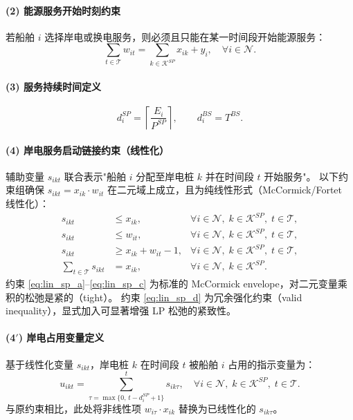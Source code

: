 \documentclass[UTF8, a4paper, 12pt]{ctexart}
\begin{document}
\paragraph{(2) 能源服务开始时刻约束}
若船舶 $i$ 选择岸电或换电服务，则必须且只能在某一时间段开始能源服务：
\begin{equation}
\sum_{t \in \mathcal{T}} w_{it}
=
\sum_{k \in \mathcal{K}^{SP}} x_{ik} + y_i,
\quad \forall i \in \mathcal{N}.
\label{eq:w_unique_24}
\end{equation}

\paragraph{(3) 服务持续时间定义}
\begin{equation}
d_i^{SP} = \left\lceil \frac{E_i}{P^{SP}} \right\rceil, 
\qquad
d_i^{BS} = T^{BS}.
\label{eq:duration_24}
\end{equation}

\paragraph{(4) 岸电服务启动链接约束（线性化）}
辅助变量 $s_{ikt}$ 联合表示"船舶 $i$ 分配至岸电桩 $k$ 并在时间段 $t$ 开始服务"。
以下约束组确保 $s_{ikt} = x_{ik} \cdot w_{it}$ 在二元域上成立，且为纯线性形式（McCormick/Fortet 线性化）：
\begin{align}
s_{ikt} &\le x_{ik},
  & \forall i \in \mathcal{N},\; k \in \mathcal{K}^{SP},\; t \in \mathcal{T},
  \label{eq:lin_sp_a} \\
s_{ikt} &\le w_{it},
  & \forall i \in \mathcal{N},\; k \in \mathcal{K}^{SP},\; t \in \mathcal{T},
  \label{eq:lin_sp_b} \\
s_{ikt} &\ge x_{ik} + w_{it} - 1,
  & \forall i \in \mathcal{N},\; k \in \mathcal{K}^{SP},\; t \in \mathcal{T},
  \label{eq:lin_sp_c} \\
\sum_{t \in \mathcal{T}} s_{ikt} &= x_{ik},
  & \forall i \in \mathcal{N},\; k \in \mathcal{K}^{SP}.
  \label{eq:lin_sp_d}
\end{align}
约束 \eqref{eq:lin_sp_a}--\eqref{eq:lin_sp_c} 为标准的 McCormick envelope，对二元变量乘积的松弛是紧的（tight）。
约束 \eqref{eq:lin_sp_d} 为冗余强化约束（valid inequality），显式加入可显著增强 LP 松弛的紧致性。

\paragraph{(4$'$) 岸电占用变量定义}
基于线性化变量 $s_{ikt}$，岸电桩 $k$ 在时间段 $t$ 被船舶 $i$ 占用的指示变量为：
\begin{equation}
u_{ikt} = \sum_{\tau = \max\{0,\, t-d_i^{SP}+1\}}^{t} s_{ik\tau},
\quad \forall i \in \mathcal{N},\; k \in \mathcal{K}^{SP},\; t \in \mathcal{T}.
\label{eq:link_sp_24_final}
\end{equation}
与原约束相比，此处将非线性项 $w_{i\tau} \cdot x_{ik}$ 替换为已线性化的 $s_{ik\tau}$。
\end{document}
